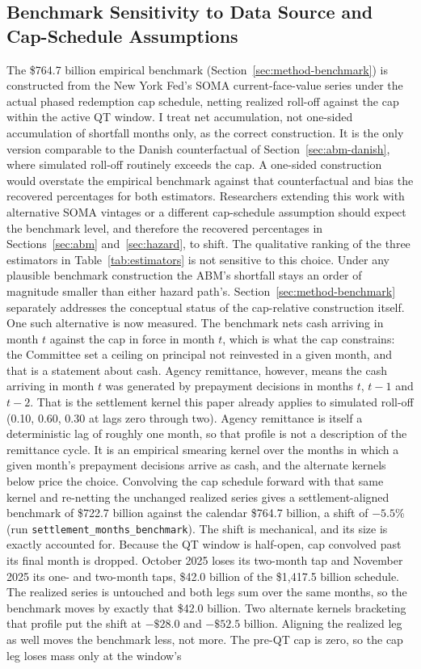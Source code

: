 \documentclass[12pt]{article}
\begin{document}
\subsection{Benchmark Sensitivity to Data Source and Cap-Schedule Assumptions}\label{sec:robustness-benchmark}

The \$764.7 billion empirical benchmark (Section~\ref{sec:method-benchmark}) is constructed from the New York Fed's SOMA current-face-value series under the actual phased redemption cap schedule, netting realized roll-off against the cap within the active QT window. I treat net accumulation, not one-sided accumulation of shortfall months only, as the correct construction. It is the only version comparable to the Danish counterfactual of Section~\ref{sec:abm-danish}, where simulated roll-off routinely exceeds the cap. A one-sided construction would overstate the empirical benchmark against that counterfactual and bias the recovered percentages for both estimators. Researchers extending this work with alternative SOMA vintages or a different cap-schedule assumption should expect the benchmark level, and therefore the recovered percentages in Sections~\ref{sec:abm} and~\ref{sec:hazard}, to shift. The qualitative ranking of the three estimators in Table~\ref{tab:estimators} is not sensitive to this choice. Under any plausible benchmark construction the ABM's shortfall stays an order of magnitude smaller than either hazard path's. Section~\ref{sec:method-benchmark} separately addresses the conceptual status of the cap-relative construction itself. One such alternative is now measured. The benchmark nets cash arriving in month $t$ against the cap in force in month $t$, which is what the cap constrains: the Committee set a ceiling on principal not reinvested in a given month, and that is a statement about cash. Agency remittance, however, means the cash arriving in month $t$ was generated by prepayment decisions in months $t$, $t-1$ and $t-2$. That is the settlement kernel this paper already applies to simulated roll-off (0.10, 0.60, 0.30 at lags zero through two). Agency remittance is itself a deterministic lag of roughly one month, so that profile is not a description of the remittance cycle. It is an empirical smearing kernel over the months in which a given month's prepayment decisions arrive as cash, and the alternate kernels below price the choice. Convolving the cap schedule forward with that same kernel and re-netting the unchanged realized series gives a settlement-aligned benchmark of \$722.7 billion against the calendar \$764.7 billion, a shift of $-5.5$\% (run \texttt{settlement\_months\_benchmark}). The shift is mechanical, and its size is exactly accounted for. Because the QT window is half-open, cap convolved past its final month is dropped. October 2025 loses its two-month tap and November 2025 its one- and two-month taps, \$42.0 billion of the \$1{,}417.5 billion schedule. The realized series is untouched and both legs sum over the same months, so the benchmark moves by exactly that \$42.0 billion. Two alternate kernels bracketing that profile put the shift at $-\$28.0$ and $-\$52.5$ billion. Aligning the realized leg as well moves the benchmark less, not more. The pre-QT cap is zero, so the cap leg loses mass only at the window's 
\end{document}
